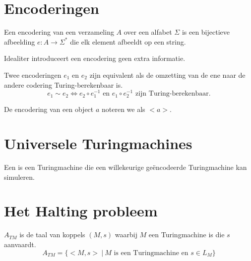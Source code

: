 \documentclass[main.tex]{subfiles}
\begin{document}


\section{Encoderingen}
\label{sec:encoderingen}

\begin{de}
  Een encodering van een verzameling $A$ over een alfabet $\Sigma$ is een bijectieve afbeelding $e: A \rightarrow \Sigma^{*}$ die elk element afbeeldt op een string.
\end{de}

\begin{opm}
  Idealiter introduceert een encodering geen extra informatie.
\end{opm}

\begin{de}
  Twee encoderingen $e_{1}$ en $e_{2}$ zijn equivalent als de omzetting van de ene naar de andere codering Turing-berekenbaar is.
  \[ e_{1} \sim e_{2} \Leftrightarrow e_{2} \circ e_{1}^{-1} \text{ en } e_{1} \circ e_{2}^{-1} \text{ zijn Turing-berekenbaar.}\]
\end{de}

\begin{de}
  De encodering van een object $a$ noteren we als $<a>$.
\end{de}

\section{Universele Turingmachines}
\label{sec:univ-turingm}

\begin{de}
  Een  is een Turingmachine die een willekeurige ge\"encodeerde Turingmachine kan simuleren.
\end{de}

\section{Het Halting probleem}
\label{sec:het-halting-probleem}

\begin{de}
  \label{de:a-tm}
  $A_{TM}$ is de taal van koppels $(M,s)$ waarbij $M$ een Turingmachine is die $s$ aanvaardt.
  \[ A_{TM} = \{ <M,s> \ |\ M \text{ is een Turingmachine en } s \in L_{M} \} \]
\end{de}
\end{document}
